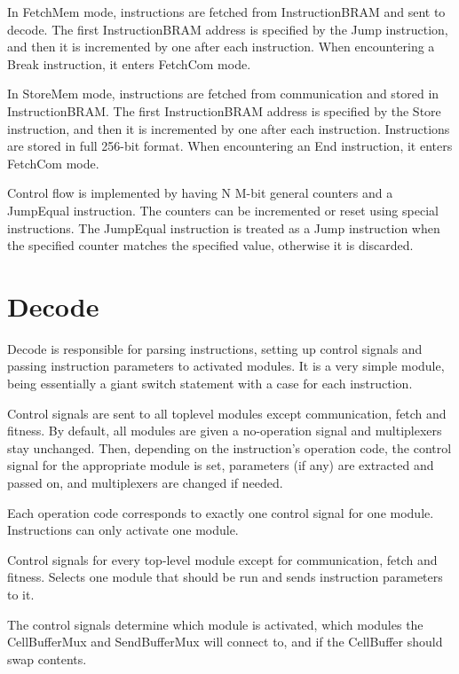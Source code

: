 In FetchMem mode, instructions are fetched from InstructionBRAM and sent to decode.
The first InstructionBRAM address is specified by the Jump instruction, and then it is incremented by one after each instruction.
When encountering a Break instruction, it enters FetchCom mode.

In StoreMem mode, instructions are fetched from communication and stored in InstructionBRAM.
The first InstructionBRAM address is specified by the Store instruction, and then it is incremented by one after each instruction.
Instructions are stored in full 256-bit format.
When encountering an End instruction, it enters FetchCom mode.

Control flow is implemented by having N M-bit general counters and a JumpEqual instruction.
The counters can be incremented or reset using special instructions.
The JumpEqual instruction is treated as a Jump instruction when the specified counter matches the specified value, otherwise it is discarded.


\section{Decode}

Decode is responsible for parsing instructions, setting up control signals and passing instruction parameters to activated modules.
It is a very simple module, being essentially a giant switch statement with a case for each instruction.

Control signals are sent to all toplevel modules except communication, fetch and fitness.
By default, all modules are given a no-operation signal and multiplexers stay unchanged.
Then, depending on the instruction's operation code, the control signal for the appropriate module is set, parameters (if any) are extracted and passed on, and multiplexers are changed if needed.

Each operation code corresponds to exactly one control signal for one module.
Instructions can only activate one module.

Control signals for every top-level module except for communication, fetch and fitness.
Selects one module that should be run and sends instruction parameters to it.

The control signals determine which module is activated, which modules the CellBufferMux and SendBufferMux will connect to, and if the CellBuffer should swap contents.


